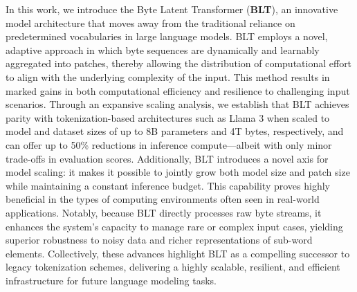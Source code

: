 In this work, we introduce the Byte Latent Transformer (\textbf{BLT}), an innovative model architecture that moves away from the traditional reliance on predetermined vocabularies in large language models. {\textsc BLT} employs a novel, adaptive approach in which byte sequences are dynamically and learnably aggregated into patches, thereby allowing the distribution of computational effort to align with the underlying complexity of the input. This method results in marked gains in both computational efficiency and resilience to challenging input scenarios. Through an expansive scaling analysis, we establish that {\textsc BLT} achieves parity with tokenization-based architectures such as Llama 3 when scaled to model and dataset sizes of up to 8B parameters and 4T bytes, respectively, and can offer up to 50\% reductions in inference compute—albeit with only minor trade-offs in evaluation scores. Additionally, {\textsc BLT} introduces a novel axis for model scaling: it makes it possible to jointly grow both model size and patch size while maintaining a constant inference budget. This capability proves highly beneficial in the types of computing environments often seen in real-world applications. Notably, because {\textsc BLT} directly processes raw byte streams, it enhances the system’s capacity to manage rare or complex input cases, yielding superior robustness to noisy data and richer representations of sub-word elements. Collectively, these advances highlight {\textsc BLT} as a compelling successor to legacy tokenization schemes, delivering a highly scalable, resilient, and efficient infrastructure for future language modeling tasks.

